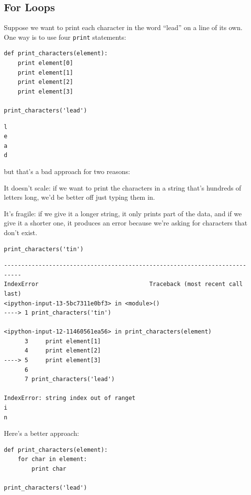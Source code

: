 \documentclass{book}
\begin{document}
\subsection{For Loops}

Suppose we want to print each character in the word ``lead'' on a line
of its own. One way is to use four \texttt{print} statements:

\begin{verbatim}
def print_characters(element):
    print element[0]
    print element[1]
    print element[2]
    print element[3]

print_characters('lead')
\end{verbatim}

\begin{verbatim}
l
e
a
d
\end{verbatim}

but that's a bad approach for two reasons:

\begin{swcenumerate}
\item
  It doesn't scale: if we want to print the characters in a string
  that's hundreds of letters long, we'd be better off just typing them
  in.
\item
  It's fragile: if we give it a longer string, it only prints part of
  the data, and if we give it a shorter one, it produces an error
  because we're asking for characters that don't exist.
\end{swcenumerate}

\begin{verbatim}
print_characters('tin')
\end{verbatim}

\begin{verbatim}
---------------------------------------------------------------------------
IndexError                                Traceback (most recent call last)
<ipython-input-13-5bc7311e0bf3> in <module>()
----> 1 print_characters('tin')

<ipython-input-12-11460561ea56> in print_characters(element)
      3     print element[1]
      4     print element[2]
----> 5     print element[3]
      6
      7 print_characters('lead')

IndexError: string index out of ranget
i
n
\end{verbatim}

Here's a better approach:

\begin{verbatim}
def print_characters(element):
    for char in element:
        print char

print_characters('lead')
\end{verbatim}
\end{document}

